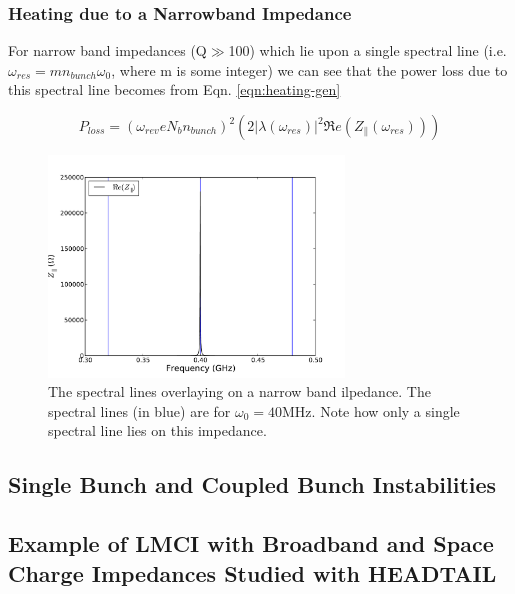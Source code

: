 \subsubsection{Heating due to a Narrowband Impedance}

For narrow band impedances (Q$\gg$100) which lie upon a single spectral line (i.e. $\omega_{res} = mn_{bunch}\omega_{0}$, where m is some integer) we can see that the power loss due to this spectral line becomes from Eqn. \ref{eqn:heating-gen}

\begin{equation}
P_{loss}  = \left( \omega_{rev}eN_{b}n_{bunch}  \right)^{2} \left( 2 \left| \lambda \left( \omega_{res} \right)  \right|^{2}  \Re{}e \left( Z_{\parallel} \left( \omega_{res}\right) \right) \right) 
\label{eqn:loss_narrow_band}
\end{equation}

\begin{figure}
\begin{center}
\includegraphics[width=0.7\textwidth]{figures/wakefields_and_impedance/impedance_narrow_band.pdf}
\caption{The spectral lines overlaying on a narrow band ilpedance. The spectral lines (in blue) are for $\omega_{0}=40\text{MHz}$. Note how only a single spectral line lies on this impedance.}
\label{fig:heating-high-q}
\end{center}
\end{figure}

\subsection{Single Bunch and Coupled Bunch Instabilities}

\subsection{Example of LMCI with Broadband and Space Charge Impedances Studied with HEADTAIL}

%
%